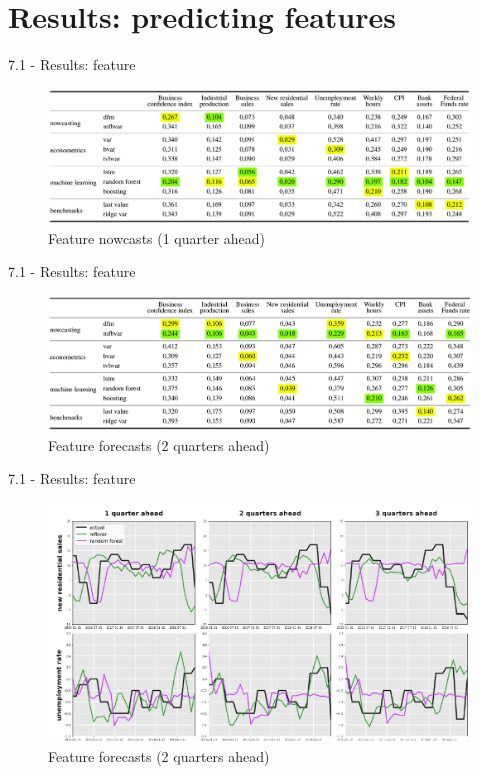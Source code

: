 \section{Results: predicting features}

\begin{frame}{7.1 - Results: feature}
	\begin{figure}[h]
	\centering
	\includegraphics[width=1\linewidth]{im5}
	\caption{Feature nowcasts (1 quarter ahead)}
	\label{fig_71_1}
	\end{figure}
\end{frame}

\begin{frame}{7.1 - Results: feature}
\begin{figure}[h]
	\centering
	\includegraphics[width=1\linewidth]{im6}
	\caption{Feature forecasts (2 quarters ahead)}
	\label{fig_71_2}
\end{figure}
\end{frame}

\begin{frame}{7.1 - Results: feature}
\begin{figure}[h]
	\centering
	\includegraphics[width=1\linewidth]{im7}
	\caption{Feature forecasts (2 quarters ahead)}
	\label{fig_71_3}
\end{figure}
\end{frame}

